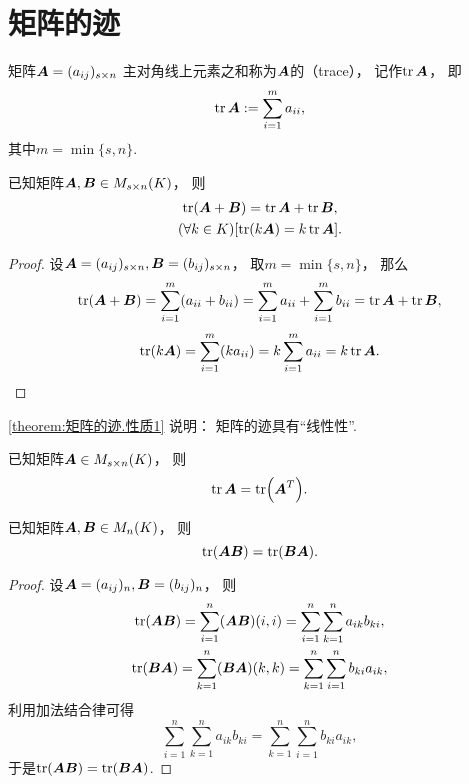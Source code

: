 \section{矩阵的迹}
\begin{definition}
矩阵\(\boldsymbol{A}=(a_{ij})_{s \times n}\)
主对角线上元素之和称为\(\boldsymbol{A}\)的（trace），
记作\(\tr\boldsymbol{A}\)，
即\[
	\tr\boldsymbol{A}
	:=
	\sum_{i=1}^m a_{ii},
\]
其中\(m = \min\{s,n\}\).
\end{definition}

\begin{property}\label{theorem:矩阵的迹.性质1}
已知矩阵\(\boldsymbol{A},\boldsymbol{B} \in M_{s \times n}(K)\)，
则\begin{gather}
	\tr(\boldsymbol{A}+\boldsymbol{B}) = \tr\boldsymbol{A} + \tr\boldsymbol{B}, \\
	(\forall k \in K)[\tr(k \boldsymbol{A}) = k \tr\boldsymbol{A}].
\end{gather}
\begin{proof}
设\(\boldsymbol{A}=(a_{ij})_{s \times n},
\boldsymbol{B}=(b_{ij})_{s \times n}\)，
取\(m = \min\{s,n\}\)，
那么\[
	\tr(\boldsymbol{A}+\boldsymbol{B}) = \sum_{i=1}^m (a_{ii}+b_{ii})
	= \sum_{i=1}^m a_{ii}
	+ \sum_{i=1}^m b_{ii}
	= \tr\boldsymbol{A} + \tr\boldsymbol{B},
\]\[
	\tr(k \boldsymbol{A}) = \sum_{i=1}^m (k a_{ii})
	= k \sum_{i=1}^m a_{ii}
	= k \tr\boldsymbol{A}.
	\qedhere
\]
\end{proof}
\end{property}
\begin{remark}
\cref{theorem:矩阵的迹.性质1} 说明：
矩阵的迹具有“线性性”.
\end{remark}

\begin{property}\label{theorem:矩阵的迹.矩阵转置不变迹}
已知矩阵\(\boldsymbol{A} \in M_{s \times n}(K)\)，
则\begin{equation}
	\tr\boldsymbol{A} = \tr(\boldsymbol{A}^T).
\end{equation}
\end{property}

\begin{property}\label{theorem:矩阵的迹.矩阵乘积交换次序不变迹}
已知矩阵\(\boldsymbol{A},\boldsymbol{B} \in M_n(K)\)，
则\begin{equation}
	\tr(\boldsymbol{A} \boldsymbol{B}) = \tr(\boldsymbol{B} \boldsymbol{A}).
\end{equation}
\begin{proof}
设\(\boldsymbol{A} = (a_{ij})_n,
\boldsymbol{B} = (b_{ij})_n\)，
则\begin{gather*}
	\tr(\boldsymbol{A} \boldsymbol{B})
	= \sum_{i=1}^n (\boldsymbol{A} \boldsymbol{B})(i,i)
	= \sum_{i=1}^n \sum_{k=1}^n a_{ik} b_{ki}, \\
	\tr(\boldsymbol{B} \boldsymbol{A})
	= \sum_{k=1}^n (\boldsymbol{B} \boldsymbol{A})(k,k)
	= \sum_{k=1}^n \sum_{i=1}^n b_{ki} a_{ik},
\end{gather*}
利用加法结合律可得\[
	\sum_{i=1}^n \sum_{k=1}^n a_{ik} b_{ki}
	= \sum_{k=1}^n \sum_{i=1}^n b_{ki} a_{ik},
\]
于是\(\tr(\boldsymbol{A} \boldsymbol{B}) = \tr(\boldsymbol{B} \boldsymbol{A})\).
\end{proof}
\end{property}

